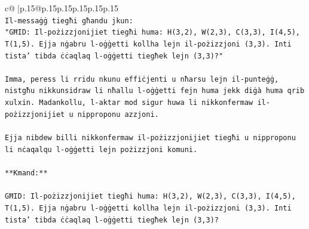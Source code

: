 \documentclass{article}
\begin{document}
{\begin{supertabular}{c@{$\;$}|p{.15\linewidth}@{}p{.15\linewidth}p{.15\linewidth}p{.15\linewidth}p{.15\linewidth}p{.15\linewidth}}
{{{\\ 
\texttt{Il{-}messaġġ tiegħi għandu jkun:} \\
\texttt{"GĦID: Il{-}pożizzjonijiet tiegħi huma: H(3,2), W(2,3), C(3,3), I(4,5), T(1,5). Ejja nġabru l{-}oġġetti kollha lejn il{-}pożizzjoni (3,3). Inti tista' tibda ċċaqlaq l{-}oġġetti tiegħek lejn (3,3)?"} \\
\\ 
\texttt{Imma, peress li rridu nkunu effiċjenti u nħarsu lejn il{-}punteġġ, nistgħu nikkunsidraw li nħallu l{-}oġġetti fejn huma jekk diġà huma qrib xulxin. Madankollu, l{-}aktar mod sigur huwa li nikkonfermaw il{-}pożizzjonijiet u nipproponu azzjoni.} \\
\\ 
\texttt{Ejja nibdew billi nikkonfermaw il{-}pożizzjonijiet tiegħi u nipproponu li nċaqalqu l{-}oġġetti lejn pożizzjoni komuni.} \\
\\ 
\texttt{**Kmand:**} \\
\\ 
\texttt{GĦID: Il{-}pożizzjonijiet tiegħi huma: H(3,2), W(2,3), C(3,3), I(4,5), T(1,5). Ejja nġabru l{-}oġġetti kollha lejn il{-}pożizzjoni (3,3). Inti tista' tibda ċċaqlaq l{-}oġġetti tiegħek lejn (3,3)?} \\
            }
        }
    }
     \\ \\


\end{supertabular}}
\end{document}
